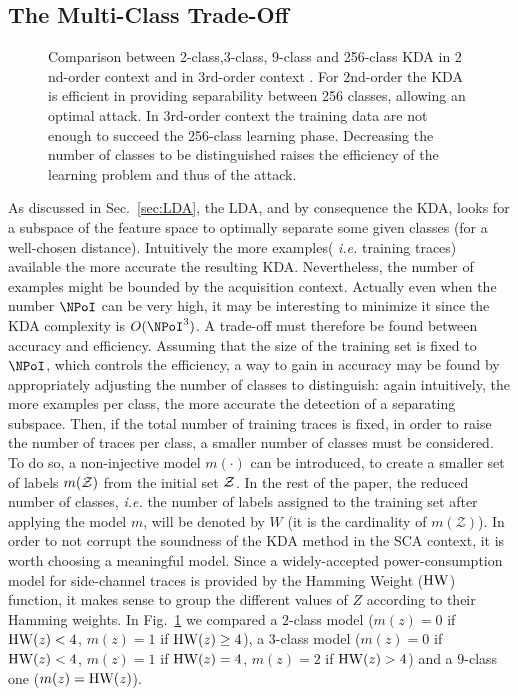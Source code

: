 \subsection{The Multi-Class Trade-Off}\label{sec:multiclass}

\begin{figure}[t]
\caption{Comparison between 2-class,3-class, 9-class and 256-class KDA in $2$nd-order context  and in $3$rd-order context . For $2$nd-order the KDA is efficient in providing separability between 256 classes, allowing an optimal attack. In $3$rd-order context the training data are not enough to succeed the 256-class learning phase. Decreasing the number of classes to be distinguished raises the efficiency of the learning problem and thus of the attack.}\label{fig:numClasses}
\end{figure}

As discussed in Sec.~\ref{sec:LDA}, the LDA, and by consequence the KDA, looks for a subspace of the feature space to optimally separate some given classes (for a well-chosen distance). Intuitively the more examples( \emph{i.e.} training traces) available the more accurate the resulting KDA. Nevertheless, the number of examples might be bounded by the acquisition context. Actually even when the number $\NPoI$ can be very high, it may be interesting to minimize it since the KDA complexity is $O(\NPoI^3)$. A trade-off must therefore be found between accuracy and efficiency. Assuming that the size of the training set  is fixed to $\NPoI$, which controls the efficiency, a way to gain in accuracy may be found by appropriately adjusting the number of classes to distinguish: again intuitively, the more examples per class, the more accurate the detection of a separating subspace. Then, if the total number of training traces is fixed, in order to raise the number of traces per class, a smaller number of classes must be considered. To do so, a non-injective model $m(\cdot)$ can be introduced, to create a smaller set of labels $m(\mathcal{Z})$ from the initial set $\mathcal{Z}$. In the rest of the paper, the reduced number of classes, \emph{i.e.} the number of labels assigned to the training set after applying the model $m$, will be denoted by $W$ (it is the cardinality of $m(\mathcal{Z})$). In order to not corrupt the soundness of the KDA method in the SCA context, it is worth choosing a meaningful model. Since a widely-accepted power-consumption model for side-channel traces is provided by the Hamming Weight ($\mathrm{HW}$) function, it makes sense to group the different values of $Z$ according to their Hamming weights. In Fig.~\ref{fig:numClasses} we compared a $2$-class model ($m(z) =0$ if $\mathrm{HW}(z)<4$, $m(z) =1$ if $\mathrm{HW}(z)\geq4$), a $3$-class model ($m(z) =0$ if $\mathrm{HW}(z)<4$, $m(z) =1$ if $\mathrm{HW}(z)=4$, $m(z) =2$ if $\mathrm{HW}(z)>4$) and a $9$-class one ($m(z)=\mathrm{HW}(z)$).


